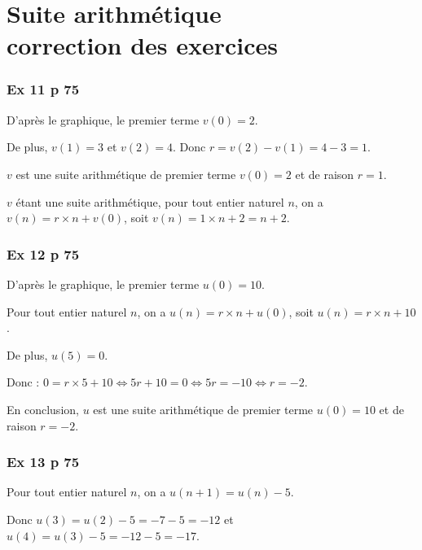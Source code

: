 \documentclass[12pt,a4paper]{book}
\begin{document}
\graphicspath{{images/}}
\chapter[Suite arithmétique - Correction des exercices]{Suite arithmétique \\ correction des exercices}
\thispagestyle{fancy}

\subsection*{Ex 11 p 75}


\begin{enumMet}
	\item D’après le graphique, le premier terme $v\left(0\right)=2$.
	
	De plus, $v\left(1\right)=3$ et $v\left(2\right)=4$. Donc $r=v\left(2\right)-v\left(1\right)=4-3=1$.
	
	$v$ est une suite arithmétique de premier terme $v\left(0\right)=2$ et de raison $r=1$.
	\item $v$ étant une suite arithmétique, pour tout entier naturel $n$, on a $v\left(n\right)=r \times n + v\left(0\right)$, soit $v\left(n\right)=1 \times n + 2=n+2$.
\end{enumMet}

\subsection*{Ex 12 p 75}

D'après le graphique, le premier terme $u\left(0\right)=10$.

Pour tout entier naturel $n$, on a $u\left(n\right)=r \times n + u\left(0\right)$, soit $u\left(n\right)=r \times n + 10$.

De plus, $u\left(5\right)=0$. 

Donc : $0=r \times 5 + 10 \Leftrightarrow 5r+10=0 \Leftrightarrow 5r=-10 \Leftrightarrow r=-2$.

En conclusion, $u$ est une suite arithmétique de premier terme $u\left(0\right)=10$ et de raison $r=-2$.

\subsection*{Ex 13 p 75}

Pour tout entier naturel $n$, on a $u\left(n+1\right)=u\left(n\right)-5$.

Donc $u\left(3\right)=u\left(2\right)-5=-7-5=-12$ et $u\left(4\right)=u\left(3\right)-5=-12-5=-17$.
\end{document}

